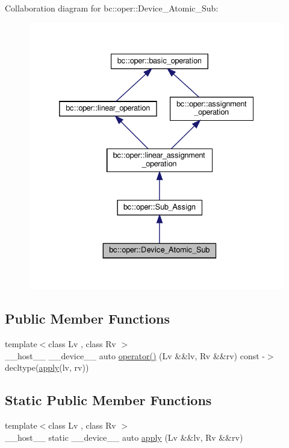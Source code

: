 Collaboration diagram for bc\+:\+:oper\+:\+:Device\+\_\+\+Atomic\+\_\+\+Sub\+:\nopagebreak
\begin{figure}[H]
\begin{center}
\leavevmode
\includegraphics[width=332pt]{structbc_1_1oper_1_1Device__Atomic__Sub__coll__graph}
\end{center}
\end{figure}
\subsection*{Public Member Functions}
\begin{DoxyCompactItemize}
\item 
{\footnotesize template$<$class Lv , class Rv $>$ }\\\+\_\+\+\_\+host\+\_\+\+\_\+ \+\_\+\+\_\+device\+\_\+\+\_\+ auto \hyperlink{structbc_1_1oper_1_1Device__Atomic__Sub_aaa195e850de4b712330f4623039c4f56}{operator()} (Lv \&\&lv, Rv \&\&rv) const -\/$>$ decltype(\hyperlink{structbc_1_1oper_1_1Device__Atomic__Sub_a1aa00894377d8ff531e5b7a991632d20}{apply}(lv, rv))
\end{DoxyCompactItemize}
\subsection*{Static Public Member Functions}
\begin{DoxyCompactItemize}
\item 
{\footnotesize template$<$class Lv , class Rv $>$ }\\\+\_\+\+\_\+host\+\_\+\+\_\+ static \+\_\+\+\_\+device\+\_\+\+\_\+ auto \hyperlink{structbc_1_1oper_1_1Device__Atomic__Sub_a1aa00894377d8ff531e5b7a991632d20}{apply} (Lv \&\&lv, Rv \&\&rv)
\end{DoxyCompactItemize}
